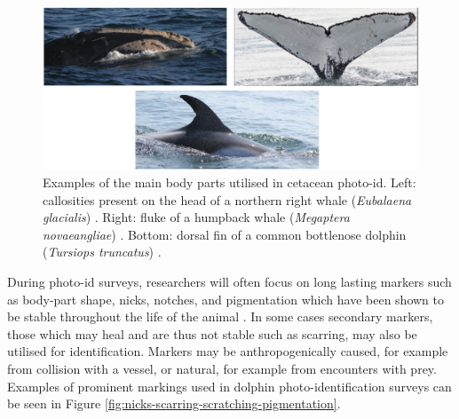 \begin{figure}
	\begin{center}
		\includegraphics[scale=0.6]{Chapter2/figs/body-part-examples.png}
	\end{center}
	\caption[Examples of the main body parts utilised in cetacean photo-id.]{Examples of the main body parts utilised in cetacean photo-id. Left: callosities present on the head of a northern right whale (\textit{Eubalaena glacialis}) \cite{perrin_encyclopedia_2009}. Right: fluke of a humpback whale (\textit{Megaptera novaeangliae}) \cite{cheeseman_happywhale_2019}. Bottom: dorsal fin of a common bottlenose dolphin (\textit{Tursiops truncatus}) \cite{trotter_ndd20_2020}.
	}
	\label{fig:body-parts}
\end{figure}

During photo-id surveys, researchers will often focus on long lasting markers such as body-part shape, nicks, notches, and pigmentation which have been shown to be stable throughout the life of the animal \cite{wursig_photographic_1977, lockyer_observations_1990, mann_cetacean_2000}. In some cases secondary markers, those which may heal and are thus not stable such as scarring, may also be utilised for identification. Markers may be anthropogenically caused, for example from collision with a vessel, or natural, for example from encounters with prey. Examples of prominent markings used in dolphin photo-identification surveys can be seen in Figure \ref{fig:nicks-scarring-scratching-pigmentation}.

